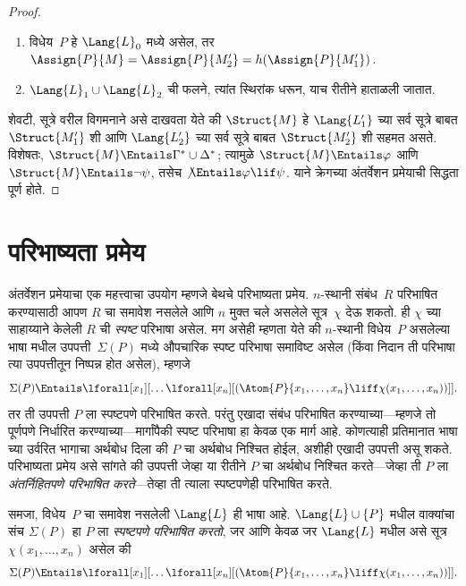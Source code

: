 \begin{proof}
\begin{enumerate}
\item विधेय~$P$ हे $\Lang{L}_0$ मध्ये असेल, तर $\Assign{P}{M} =
  \Assign{P}{M'_2} = h(\Assign{P}{M'_1})$.
\item $\Lang{L}_1 \cup \Lang{L}_2$ ची फलने, त्यांत
  स्थिरांक धरून, याच रीतीने हाताळली जातात.
\end{enumerate}

शेवटी, सूत्रे वरील विगमनाने असे दाखवता येते की $\Struct{M}$ हे
$\Lang{L'_1}$ च्या सर्व सूत्रे बाबत $\Struct{M'_1}$ शी आणि
$\Lang{L'_2}$ च्या सर्व सूत्रे बाबत $\Struct{M'_2}$ शी सहमत असते.
विशेषतः, $\Struct{M} \Entails \Gamma^* \cup \Delta^*$; त्यामुळे
$\Struct{M} \Entails \varphi$ आणि $\Struct{M} \Entails \lnot\psi$, तसेच
$\not\Entails \varphi \lif \psi$. याने क्रेगच्या अंतर्वेशन प्रमेयाची सिद्धता
पूर्ण होते.
\end{proof}












\section{परिभाष्यता प्रमेय}\label{mod:int:def:sec}

अंतर्वेशन प्रमेयाचा एक महत्त्वाचा उपयोग म्हणजे बेथचे परिभाष्यता प्रमेय.
$n$-स्थानी संबंध~$R$ परिभाषित करण्यासाठी आपण $R$ चा समावेश नसलेले आणि
$n$ मुक्त चले असलेले सूत्र~$\chi$ देऊ शकतो. ही $\chi$ च्या
साहाय्याने केलेली $R$ ची \emph{स्पष्ट} परिभाषा असेल. मग असेही म्हणता येते
की $n$-स्थानी विधेय~$P$ असलेल्या भाषा मधील
उपपत्ती~$\Sigma(P)$ मध्ये औपचारिक स्पष्ट परिभाषा समाविष्ट असेल (किंवा निदान
ती परिभाषा त्या उपपत्तीतून निष्पन्न होत असेल), म्हणजे
\[\Sigma(P) \Entails \lforall[x_1][\dots
  \lforall[x_n][(\Atom{P}{x_1,\dots, x_n} \liff \chi(x_1, \dots,
    x_n))]].
\]
तर ती उपपत्ती $P$ ला स्पष्टपणे परिभाषित करते. परंतु एखादा संबंध
परिभाषित करण्याच्या---म्हणजे तो पूर्णपणे निर्धारित करण्याच्या---मार्गांपैकी
स्पष्ट परिभाषा हा केवळ एक मार्ग आहे. कोणत्याही प्रतिमानात भाषा च्या उर्वरित भागाचा अर्थबोध
दिला की $P$ चा अर्थबोध निश्चित होईल, अशीही एखादी उपपत्ती असू शकते.
परिभाष्यता प्रमेय असे सांगते की उपपत्ती जेव्हा या रीतीने $P$ चा अर्थबोध
निश्चित करते---जेव्हा ती $P$ ला \emph{अंतर्निहितपणे परिभाषित करते}---तेव्हा
ती त्याला स्पष्टपणेही परिभाषित करते.

\begin{defn}
समजा, विधेय~$P$ चा समावेश नसलेली $\Lang{L}$ ही भाषा आहे. $\Lang{L}
\cup \{P\}$ मधील वाक्यांचा संच $\Sigma(P)$ हा $P$ ला
\emph{स्पष्टपणे परिभाषित करतो}, जर आणि केवळ जर $\Lang{L}$ मधील असे
सूत्र~$\chi(x_1, \dots, x_n)$ असेल की
\[\Sigma(P) \Entails \lforall[x_1][\dots
  \lforall[x_n][(\Atom{P}{x_1,\dots, x_n} \liff \chi(x_1, \dots,
    x_n))]].
\]
\end{defn}

